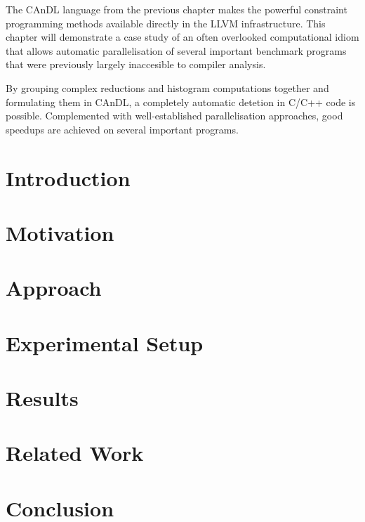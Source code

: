 
    The CAnDL language from the previous chapter makes the powerful constraint
    programming methods available directly in the LLVM infrastructure.
    This chapter will demonstrate a case study of an often overlooked
    computational idiom that allows automatic parallelisation of several
    important benchmark programs that were previously largely inaccesible to
    compiler analysis.

    By grouping complex reductions and histogram computations together and
    formulating them in CAnDL, a completely automatic detetion in C/C++ code is
    possible.
    Complemented with well-established parallelisation approaches, good speedups
    are achieved on several important programs.
\section{Introduction}
\section{Motivation}

\section{Approach}

\section{Experimental Setup}

\section{Results}

\section{Related Work}

\section{Conclusion}